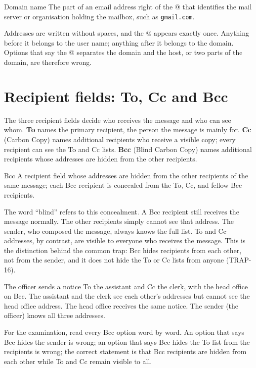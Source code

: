 \begin{definitionbox}{Domain name}
The part of an email address right of the @ that identifies the mail server or
organisation holding the mailbox, such as \texttt{gmail.com}.
\end{definitionbox}

Addresses are written without spaces, and the @ appears exactly once.
Anything before it belongs to the user name; anything after it belongs to the
domain. Options that say the @ separates the domain and the host, or two
parts of the domain, are therefore wrong.

\section{Recipient fields: To, Cc and Bcc}
The three recipient fields decide who receives the message and who can see
whom. \textbf{To} names the primary recipient, the person the message is
mainly for. \textbf{Cc} (Carbon Copy) names additional recipients who receive
a visible copy; every recipient can see the To and Cc lists. \textbf{Bcc}
(Blind Carbon Copy) names additional recipients whose addresses are hidden
from the other recipients.

\begin{definitionbox}{Bcc}
A recipient field whose addresses are hidden from the other recipients of the
same message; each Bcc recipient is concealed from the To, Cc, and fellow Bcc
recipients.
\end{definitionbox}

The word ``blind'' refers to this concealment. A Bcc recipient still receives
the message normally. The other recipients simply cannot see that address.
The sender, who composed the message, always knows the full list. To and Cc
addresses, by contrast, are visible to everyone who receives the message.
This is the distinction behind the common trap: Bcc hides recipients from each
other, not from the sender, and it does not hide the To or Cc lists from
anyone (TRAP-16).

\begin{example}
The officer sends a notice To the assistant and Cc the clerk, with the head
office on Bcc. The assistant and the clerk see each other's addresses but
cannot see the head office address. The head office receives the same notice.
The sender (the officer) knows all three addresses.
\end{example}

For the examination, read every Bcc option word by word. An option that says
Bcc hides the sender is wrong; an option that says Bcc hides the To list from
the recipients is wrong; the correct statement is that Bcc recipients are
hidden from each other while To and Cc remain visible to all.

